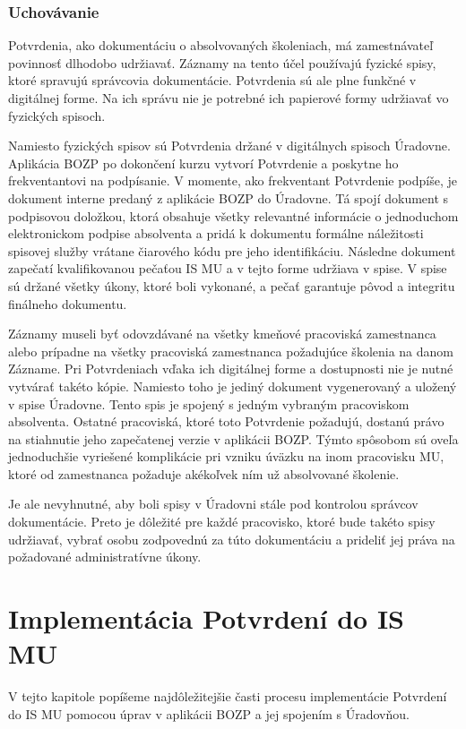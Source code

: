 \documentclass[
  digital,     %
  oneside,     %
  nosansbold,  %
  nocolorbold, %
  lof,         %
  nolot,         %
]{fithesis4}
\begin{document}
\subsection*{Uchovávanie}
Potvrdenia, ako dokumentáciu o absolvovaných školeniach, má zamestnávateľ povinnosť dlhodobo udržiavať. Záznamy na tento účel používajú fyzické spisy, ktoré spravujú správcovia dokumentácie. Potvrdenia sú ale plne funkčné v digitálnej forme. Na ich správu nie je potrebné ich papierové formy udržiavať vo fyzických spisoch.

Namiesto fyzických spisov sú Potvrdenia držané v digitálnych spisoch Úradovne. Aplikácia BOZP po dokončení kurzu vytvorí Potvrdenie a poskytne ho frekventantovi na podpísanie. V momente, ako frekventant Potvrdenie podpíše, je dokument interne predaný z aplikácie BOZP do Úradovne. Tá spojí dokument s podpisovou doložkou, ktorá obsahuje všetky relevantné informácie o jednoduchom elektronickom podpise absolventa a pridá k dokumentu formálne náležitosti spisovej služby vrátane čiarového kódu pre jeho identifikáciu. Následne dokument zapečatí kvalifikovanou pečaťou IS MU a v tejto forme udržiava v spise. V spise sú držané všetky úkony, ktoré boli vykonané, a pečať garantuje pôvod a integritu finálneho dokumentu.

Záznamy museli byť odovzdávané na všetky kmeňové pracoviská zamestnanca alebo prípadne na všetky pracoviská zamestnanca požadujúce školenia na danom Zázname. Pri Potvrdeniach vďaka ich digitálnej forme a dostupnosti nie je nutné vytvárať takéto kópie. Namiesto toho je jediný dokument vygenerovaný a uložený v spise Úradovne. Tento spis je spojený s jedným vybraným pracoviskom absolventa. Ostatné pracoviská, ktoré toto Potvrdenie požadujú, dostanú právo na stiahnutie jeho zapečatenej verzie v aplikácii BOZP. Týmto spôsobom sú oveľa jednoduchšie vyriešené komplikácie pri vzniku úväzku na inom pracovisku MU, ktoré od zamestnanca požaduje akékoľvek ním už absolvované školenie.

Je ale nevyhnutné, aby boli spisy v Úradovni stále pod kontrolou správcov dokumentácie. Preto je dôležité pre každé pracovisko, ktoré bude takéto spisy udržiavať, vybrať osobu zodpovednú za túto dokumentáciu a prideliť jej práva na požadované administratívne úkony.

\chapter{Implementácia Potvrdení do IS MU}
\label{kap-7}
V tejto kapitole popíšeme najdôležitejšie časti procesu implementácie Potvrdení do IS MU pomocou úprav v aplikácii BOZP a jej spojením s Úradovňou.
\end{document}
